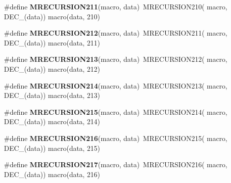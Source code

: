 \begin{DoxyCompactItemize}
\item 
\hypertarget{group__group__sam0__utils__mrecursion_ga3448b343677307b3d5c5ec396ae73c4e}{}\#define {\bfseries M\+R\+E\+C\+U\+R\+S\+I\+O\+N211}(macro,  data)~M\+R\+E\+C\+U\+R\+S\+I\+O\+N210(  macro, D\+E\+C\+\_\+(data))   macro(data, 210)\label{group__group__sam0__utils__mrecursion_ga3448b343677307b3d5c5ec396ae73c4e}

\item 
\hypertarget{group__group__sam0__utils__mrecursion_gad848cc0ac4bd174398a6421a1da308c7}{}\#define {\bfseries M\+R\+E\+C\+U\+R\+S\+I\+O\+N212}(macro,  data)~M\+R\+E\+C\+U\+R\+S\+I\+O\+N211(  macro, D\+E\+C\+\_\+(data))   macro(data, 211)\label{group__group__sam0__utils__mrecursion_gad848cc0ac4bd174398a6421a1da308c7}

\item 
\hypertarget{group__group__sam0__utils__mrecursion_ga6889e48b19ed9abc794256617f4b6758}{}\#define {\bfseries M\+R\+E\+C\+U\+R\+S\+I\+O\+N213}(macro,  data)~M\+R\+E\+C\+U\+R\+S\+I\+O\+N212(  macro, D\+E\+C\+\_\+(data))   macro(data, 212)\label{group__group__sam0__utils__mrecursion_ga6889e48b19ed9abc794256617f4b6758}

\item 
\hypertarget{group__group__sam0__utils__mrecursion_gad5d21c13be81fdbaabdf6dad7968fbd2}{}\#define {\bfseries M\+R\+E\+C\+U\+R\+S\+I\+O\+N214}(macro,  data)~M\+R\+E\+C\+U\+R\+S\+I\+O\+N213(  macro, D\+E\+C\+\_\+(data))   macro(data, 213)\label{group__group__sam0__utils__mrecursion_gad5d21c13be81fdbaabdf6dad7968fbd2}

\item 
\hypertarget{group__group__sam0__utils__mrecursion_ga5e1d85eb398f85ae49997b1202f36a9a}{}\#define {\bfseries M\+R\+E\+C\+U\+R\+S\+I\+O\+N215}(macro,  data)~M\+R\+E\+C\+U\+R\+S\+I\+O\+N214(  macro, D\+E\+C\+\_\+(data))   macro(data, 214)\label{group__group__sam0__utils__mrecursion_ga5e1d85eb398f85ae49997b1202f36a9a}

\item 
\hypertarget{group__group__sam0__utils__mrecursion_ga6d25603f9fa30627ed714c4853ec50a4}{}\#define {\bfseries M\+R\+E\+C\+U\+R\+S\+I\+O\+N216}(macro,  data)~M\+R\+E\+C\+U\+R\+S\+I\+O\+N215(  macro, D\+E\+C\+\_\+(data))   macro(data, 215)\label{group__group__sam0__utils__mrecursion_ga6d25603f9fa30627ed714c4853ec50a4}

\item 
\hypertarget{group__group__sam0__utils__mrecursion_ga833c81184ac65b08f60d98bf30ff1cfb}{}\#define {\bfseries M\+R\+E\+C\+U\+R\+S\+I\+O\+N217}(macro,  data)~M\+R\+E\+C\+U\+R\+S\+I\+O\+N216(  macro, D\+E\+C\+\_\+(data))   macro(data, 216)\label{group__group__sam0__utils__mrecursion_ga833c81184ac65b08f60d98bf30ff1cfb}


\end{DoxyCompactItemize}
